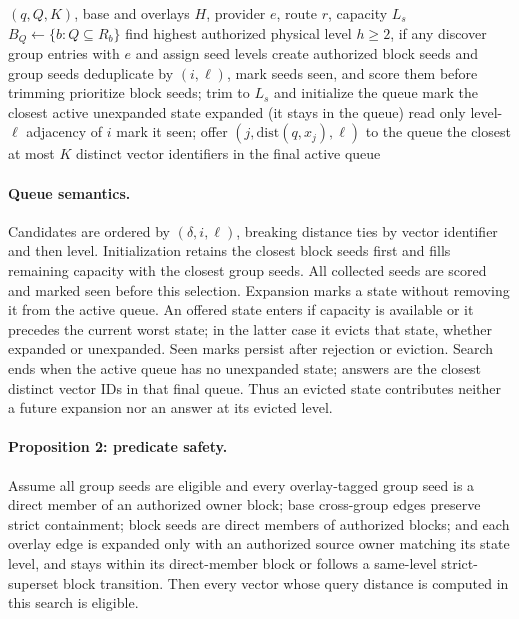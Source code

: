 \begin{algorithm}[t]
\caption{Level-local containment search}
\label{alg:query}
\begin{algorithmic}[1]
\Require $(q,Q,K)$, base and overlays $H$, provider $e$, route $r$, capacity $L_s$
 \State \Return {}
\EndIf
\State $B_Q\gets\{b:Q\subseteq R_b\}$
 \State find highest authorized physical level $h\ge2$, if any
  \State \Return {}
 \EndIf
\EndIf
\State discover group entries with $e$ and assign seed levels
\State create authorized block seeds and group seeds
\State deduplicate by $(i,\ell)$, mark seeds seen, and score them before trimming
\State prioritize block seeds; trim to $L_s$ and initialize the queue
 \State mark the closest active unexpanded state expanded (it stays in the queue)
 \State read only level-$\ell$ adjacency of $i$
   \State mark it seen; offer $(j,\mathrm{dist}(q,x_j),\ell)$ to the queue
  \EndIf
 \EndFor
\EndWhile
\State \Return the closest at most $K$ distinct vector identifiers in the final active queue
\end{algorithmic}
\end{algorithm}

\paragraph{Queue semantics.}
Candidates are ordered by $(\delta,i,\ell)$, breaking distance ties by
vector identifier and then level. Initialization retains the closest block
seeds first and fills remaining capacity with the closest group seeds. All
collected seeds are scored and marked seen before this selection. Expansion
marks a state without removing it from the active queue. An offered state
enters if capacity is available or it precedes the current worst state;
in the latter case it evicts that state, whether expanded or unexpanded.
Seen marks persist after rejection or eviction. Search ends when the active
queue has no unexpanded state; answers are the closest distinct vector IDs
in that final queue. Thus an evicted state contributes neither a future
expansion nor an answer at its evicted level.

\paragraph{Proposition 2: predicate safety.}
Assume all group seeds are eligible and every overlay-tagged group seed is
a direct member of an authorized owner block; base cross-group edges preserve strict
containment; block seeds are direct members of authorized blocks; and each
overlay edge is expanded only with an authorized source owner matching
its state level, and stays within its direct-member block or follows a same-level
strict-superset block transition.  Then every vector whose query distance is
computed in this search is eligible.


